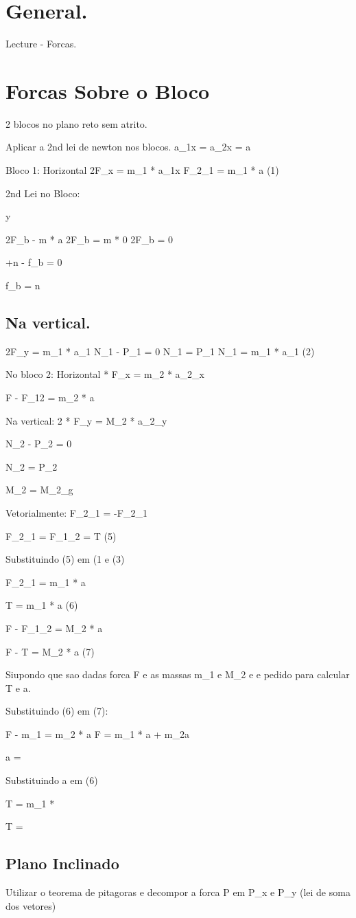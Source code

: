 \documentclass[a4paper,12pt]{article}
\begin{document}
\section{General.}
Lecture - Forcas.
\section{Forcas Sobre o Bloco}
2 blocos no plano reto \to sem atrito.

Aplicar a 2nd lei de newton nos blocos.
a_1x = a_2x = a

Bloco 1:
Horizontal \to 2F_x = m_1 * a_1x
F_2_1 = m_1 * a (1)

2nd Lei no Bloco:

\uparrow y

2F_b - m * a
2F_b = m * 0
2F_b = 0

+n - f_b = 0

f_b = n

\subsection{Na vertical.}
2F_y = m_1 * a_1
N_1 - P_1 = 0
N_1 = P_1
N_1 = m_1 * a_1 (2)

No bloco 2:
Horizontal  * F_x = m_2 * a_2_x

F - F_12 = m_2 * a

Na vertical:
2 * F_y = M_2 * a_2_y

N_2 - P_2 = 0

N_2 = P_2

M_2 = M_2_g

Vetorialmente:
F_2_1 = -F_2_1

F_2_1 = F_1_2 = T (5)

Substituindo (5) em (1 e (3)

F_2_1 = m_1 * a

T = m_1 * a (6)

F - F_1_2 = M_2 * a

F - T = M_2 * a (7)

Siupondo que sao dadas  forca F e as massas m_1 e M_2 e e pedido para calcular T e a.

Substituindo (6) em (7):

F - m_1 = m_2 * a
F = m_1 * a + m_2a

a = 

Substituindo a em (6)

T = m_1 * 

T = 

\subsection{Plano Inclinado}

Utilizar o teorema de pitagoras e decompor a forca P em P_x e P_y (lei de soma dos vetores)
\end{document}
